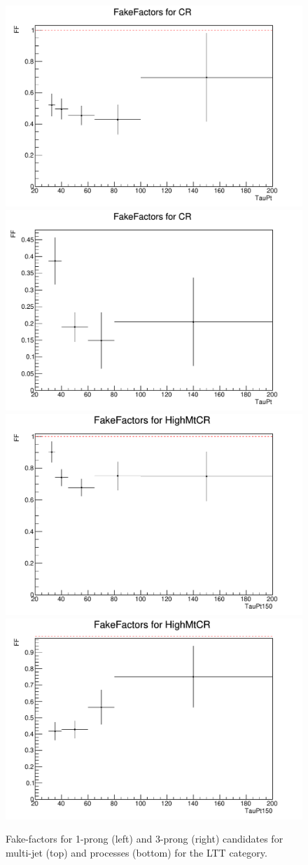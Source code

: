 \begin{figure}
\centering
\includegraphics[width=.4\textwidth]{figures/lephadFF/LTT/FF_All_Preselection_Np1_CR_2tag_TauPt}
\includegraphics[width=.4\textwidth]{figures/lephadFF/LTT/FF_All_Preselection_Np3_CR_2tag_TauPt} \\
\includegraphics[width=.4\textwidth]{figures/lephadFF/LTT/FF_All_Preselection_Np1_HighMtCR_2tag_TauPt150}
\includegraphics[width=.4\textwidth]{figures/lephadFF/LTT/FF_All_Preselection_Np3_HighMtCR_2tag_TauPt150}\\
\caption{Fake-factors for 1-prong (left) and 3-prong (right) \tauhad candidates for multi-jet (top) and \ttbar processes (bottom) for the \lephad LTT category.}
\label{fig:LTT_FF}
\end{figure}

